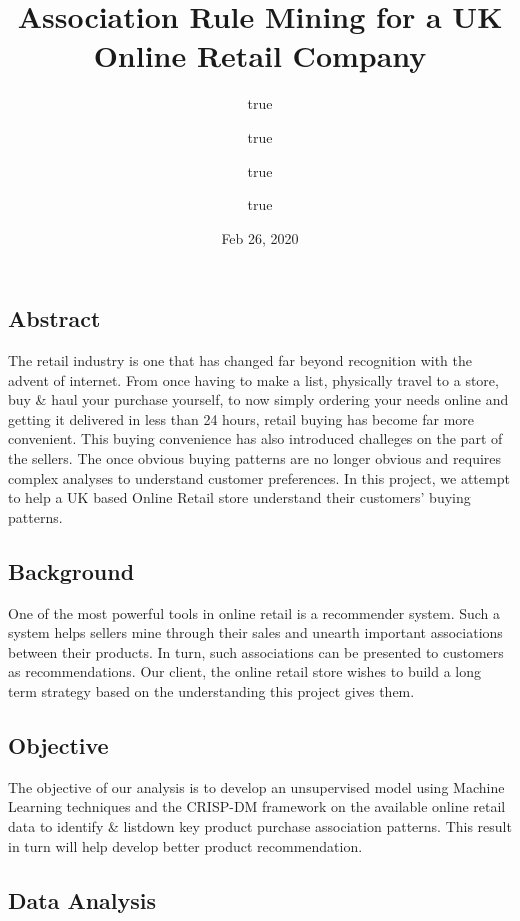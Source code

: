 \documentclass[
]{article}
\title{Association Rule Mining for a UK Online Retail Company}
\author{true \and true \and true \and true}
\date{Feb 26, 2020}
\begin{document}
\maketitle

\hypertarget{abstract}{%
\subsection{Abstract}\label{abstract}}

The retail industry is one that has changed far beyond recognition with
the advent of internet. From once having to make a list, physically
travel to a store, buy \& haul your purchase yourself, to now simply
ordering your needs online and getting it delivered in less than 24
hours, retail buying has become far more convenient. This buying
convenience has also introduced challeges on the part of the sellers.
The once obvious buying patterns are no longer obvious and requires
complex analyses to understand customer preferences. In this project, we
attempt to help a UK based Online Retail store understand their
customers' buying patterns.

\hypertarget{background}{%
\subsection{Background}\label{background}}

One of the most powerful tools in online retail is a recommender system.
Such a system helps sellers mine through their sales and unearth
important associations between their products. In turn, such
associations can be presented to customers as recommendations. Our
client, the online retail store wishes to build a long term strategy
based on the understanding this project gives them.

\hypertarget{objective}{%
\subsection{Objective}\label{objective}}

The objective of our analysis is to develop an unsupervised model using
Machine Learning techniques and the CRISP-DM framework on the available
online retail data to identify \& listdown key product purchase
association patterns. This result in turn will help develop better
product recommendation.

\hypertarget{data-analysis}{%
\subsection{Data Analysis}\label{data-analysis}}
\end{document}
